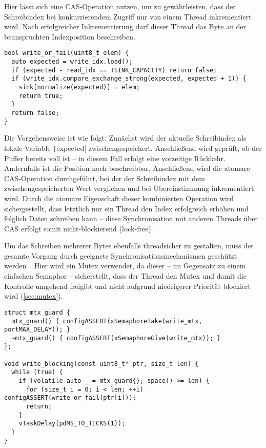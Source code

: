 Hier lässt sich eine \ac{CAS}-Operation nutzen, um zu gewährleisten, dass der
Schreibindex bei konkurrierendem Zugriff nur von einem Thread inkrementiert
wird. Nach erfolgreicher Inkrementierung darf dieser Thread das Byte an der
beanspruchten Indexposition beschreiben.

\begin{code}
\begin{verbatim}
bool write_or_fail(uint8_t elem) {
  auto expected = write_idx.load();
  if (expected - read_idx == TSINK_CAPACITY) return false;
  if (write_idx.compare_exchange_strong(expected, expected + 1)) {
    sink[normalize(expected)] = elem;
    return true;
  }
  return false;
}
\end{verbatim}
\end{code}

Die Vorgehensweise ist wie folgt: Zunächst wird der aktuelle Schreibindex als
lokale Variable \texttt|expected| zwischengespeichert. Anschließend
wird geprüft, ob der Puffer bereits voll ist -- in diesem Fall erfolgt eine
vorzeitige Rückkehr. Andernfalls ist die Position noch beschreibbar.
Anschließend wird die atomare CAS-Operation durchgeführt, bei der der
Schreibindex mit dem zwischengespeicherten Wert verglichen und bei
Übereinstimmung inkrementiert wird. Durch die atomare Eigenschaft dieser
kombinierten Operation wird sichergestellt, dass letztlich nur ein Thread den
Index erfolgreich erhöhen und folglich Daten schreiben kann -- diese
Synchronisation mit anderen Threads über CAS erfolgt somit nicht-blockierend
(lock-free).

Um das Schreiben mehrerer Bytes ebenfalls threadsicher zu gestalten, muss der
gesamte Vorgang durch geeignete Synchronisationsmechanismen geschützt
werden~\cite{FreeRTOSForumPrintf}. Hier wird ein Mutex verwendet, da dieser --
im Gegensatz zu einem einfachen Semaphor -- sicherstellt, dass der Thread den
Mutex und damit die Kontrolle umgehend freigibt und nicht aufgrund niedrigerer
Priorität blockiert wird (\ref{sec:mutex}).

\begin{code}
\begin{verbatim}
struct mtx_guard {
  mtx_guard() { configASSERT(xSemaphoreTake(write_mtx, portMAX_DELAY)); }
  ~mtx_guard() { configASSERT(xSemaphoreGive(write_mtx)); }
};

void write_blocking(const uint8_t* ptr, size_t len) {
  while (true) {
    if (volatile auto _ = mtx_guard{}; space() >= len) {
      for (size_t i = 0; i < len; ++i) configASSERT(write_or_fail(ptr[i]));
      return;
    }
    vTaskDelay(pdMS_TO_TICKS(1));
  }
}
\end{verbatim}
\end{code}

